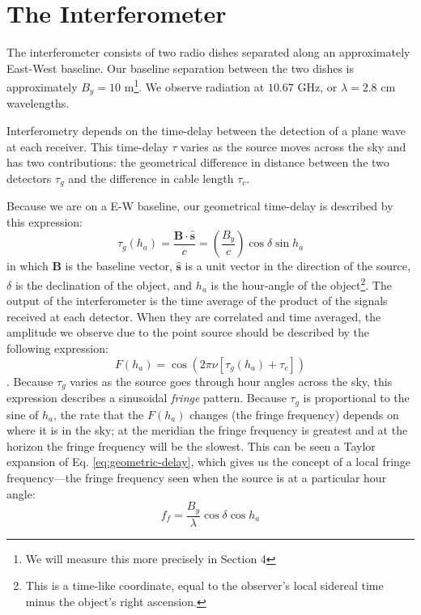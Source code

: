 \documentclass[12pt]{article}
\begin{document}
\section{The Interferometer}
The interferometer consists of two radio dishes separated along an approximately East-West baseline. Our baseline separation between the two dishes is approximately $B_y = 10$ m\footnote{We will measure this more precisely in Section 4}. We observe radiation at $10.67$ GHz, or $\lambda = 2.8$ cm wavelengths.

Interferometry depends on the time-delay between the detection of a plane wave at each receiver. This time-delay $\tau$ varies as the source moves across the sky and has two contributions: the geometrical difference in distance between the two detectors $\tau_g$ and the difference in cable length $\tau_c$.

Because we are on a E-W baseline, our geometrical time-delay is described by this expression:
\begin{equation}
\tau_g(h_a)= \frac{\mathbf{B} \cdot \mathbf{\hat{s}}}{c} = \left( \frac{B_y}{c} \right) \cos{\delta} \sin{h_a} \label{eq:geometric-delay}
\end{equation}
in which $\mathbf{B}$ is the baseline vector, $\mathbf{\hat{s}}$ is a unit vector in the direction of the source, $\delta$ is the declination of the object, and $h_a$ is the hour-angle of the object\footnote{This is a time-like coordinate, equal to the observer's local sidereal time minus the object's right ascension.}.
The output of the interferometer is the time average of the product of the signals received at each detector. When they are correlated and time averaged, the amplitude we observe due to the point source should be described by the following expression:
\begin{equation}
F(h_a) = \cos(2\pi \nu [\tau_g (h_a) + \tau_c]) \label{eq:fringe-output}
\end{equation}.
Because $\tau_g$ varies as the source goes through hour angles across the sky, this expression describes a sinusoidal \textit{fringe} pattern. Because $\tau_g$ is proportional to the sine of $h_a$, the rate that the $F(h_a)$ changes (the fringe frequency) depends on where it is in the sky; at the meridian the fringe frequency is greatest and at the horizon the fringe frequency will be the slowest. This can be seen a Taylor expansion of Eq. \ref{eq:geometric-delay}, which gives us the concept of a local fringe frequency---the fringe frequency seen when the source is at a particular hour angle:
\begin{equation}
f_f = \frac{B_y}{\lambda}	\cos{\delta} \cos{h_a} \label{eq:local-fringe-frequency}
\end{equation}
\end{document}
